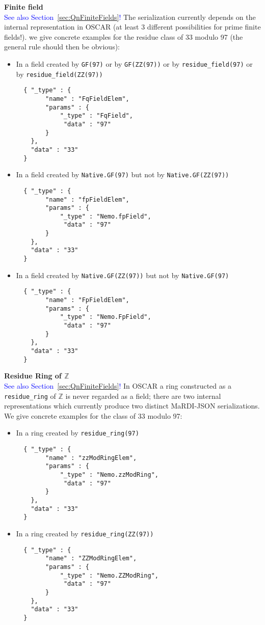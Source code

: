 \documentclass{article}
\newcommand{\MaRDIJSON}{MaRDI-JSON}
\newcommand \ZZ {{\mathbb Z}}
\def\blue#1{\textcolor{blue}{#1}}
\begin{document}
\textbf{Finite field}\\
\blue{See also Section~\ref{sec:QnFiniteFields}!}
The serialization currently depends on the
internal representation in OSCAR (at least 3 different possibilities for prime
finite fields!).  we give concrete examples for the residue class of
33 modulo 97 (the general rule should then be obvious):
\begin{itemize}
  \item In a field created by \verb|GF(97)|  or by \verb|GF(ZZ(97))|  or by \verb|residue_field(97)| or by \verb|residue_field(ZZ(97))|
\begin{verbatim}
  { "_type" : {
        "name" : "FqFieldElem",
        "params" : {
            "_type" : "FqField",
             "data" : "97"
        }
    },
    "data" : "33"
  }
\end{verbatim}
\item In a field created by \verb|Native.GF(97)|  but not by \verb|Native.GF(ZZ(97))|
\begin{verbatim}
  { "_type" : {
        "name" : "fpFieldElem",
        "params" : {
            "_type" : "Nemo.fpField",
             "data" : "97"
        }
    },
    "data" : "33"
  }
\end{verbatim}
\item In a field created by \verb|Native.GF(ZZ(97))| but not by \verb|Native.GF(97)|
\begin{verbatim}
  { "_type" : {
        "name" : "FpFieldElem",
        "params" : {
            "_type" : "Nemo.FpField",
             "data" : "97"
        }
    },
    "data" : "33"
  }
\end{verbatim}
\end{itemize}

\textbf{Residue Ring of $\ZZ$}\\
\blue{See also Section~\ref{sec:QnFiniteFields}!}
In OSCAR a ring constructed as a \verb|residue_ring| of $\ZZ$ is never
regarded as a field; there are two internal representations which
currently produce two distinct {\MaRDIJSON} serializations.  We give
concrete examples for the class of 33 modulo 97:
\begin{itemize}
\item In a ring created by \verb|residue_ring(97)|
\begin{verbatim}
  { "_type" : {
        "name" : "zzModRingElem",
        "params" : {
            "_type" : "Nemo.zzModRing",
             "data" : "97"
        }
    },
    "data" : "33"
  }
\end{verbatim}
\item In a ring created by \verb|residue_ring(ZZ(97))|
\begin{verbatim}
  { "_type" : {
        "name" : "ZZModRingElem",
        "params" : {
            "_type" : "Nemo.ZZModRing",
             "data" : "97"
        }
    },
    "data" : "33"
  }
\end{verbatim}
\end{itemize}
\end{document}
